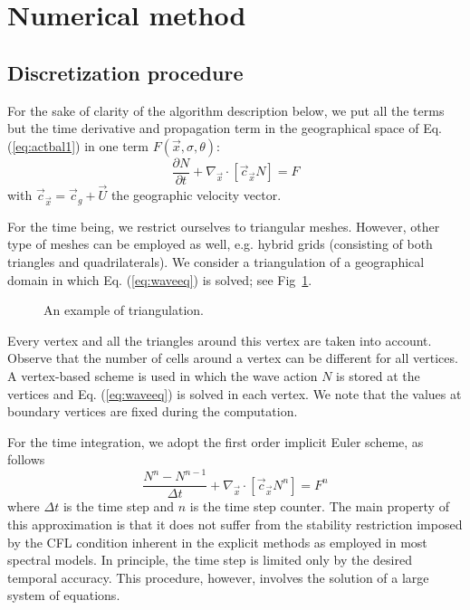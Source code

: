 \documentclass[12pt]{book}
\begin{document}
\section{Numerical method}
\label{sec:nummeth}

\subsection{Discretization procedure}

For the sake of clarity of the algorithm description below, we put all the terms but the time derivative and propagation term in the geographical space of Eq. (\ref{eq:actbal1})
in one term $F(\vec{x},\sigma,\theta)$:
\begin{equation}
  \frac{\partial N}{\partial t} + \nabla_{\vec{x}} \cdot [\vec{c}_{\vec{x}} N] = F
  \label{eq:waveeq}
\end{equation}
with $\vec{c}_{\vec{x}} = {\vec{c}}_g + \vec{U}$ the geographic velocity vector.

For the time being, we restrict ourselves to triangular meshes. However, other
type of meshes can be employed as well, e.g. hybrid grids (consisting of both triangles and quadrilaterals). We consider a triangulation of a geographical domain in which
Eq. (\ref{eq:waveeq}) is solved; see Fig~\ref{fig:triangul}.
\begin{figure}[htb]
   \centerline{
              }
      \caption{An example of triangulation.}
      \label{fig:triangul}
\end{figure}
Every vertex and all the triangles around this vertex are taken into account.
Observe that the number of cells around a vertex can be different for all vertices.
A vertex-based scheme is used in which the wave action $N$ is stored at the vertices and Eq. (\ref{eq:waveeq}) is solved in each vertex.
We note that the values at boundary vertices are fixed during the computation.

For the time integration, we adopt the first order implicit Euler scheme, as follows
\begin{equation}
  \frac{N^n - N^{n-1}}{\Delta t} + \nabla_{\vec{x}} \cdot [\vec{c}_{\vec{x}} N^n] = F^n
  \label{eq:waveeq2}
\end{equation}
where $\Delta t$ is the time step and $n$ is the time step counter. The main property of this approximation is that it does not suffer from the stability restriction
imposed by the CFL condition inherent in the explicit methods as employed in most spectral models. In principle, the time step is limited only by
the desired temporal accuracy. This procedure, however, involves the solution of a large system of equations.
\end{document}
